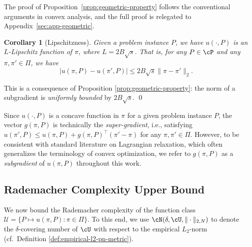 \documentclass{article}
\theoremstyle{plain}
\newtheorem{corollary}[theorem]{Corollary}
\theoremstyle{definition}
\theoremstyle{remark}
\begin{document}
The proof of Proposition~\ref{prop:geometric-property} follows the conventional arguments in convex analysis, and the full proof is relegated to Appendix~\ref{sec:app-geometric}.


\begin{corollary}[Lipschitzness] \label{cor:bounded-diam}
    Given a problem instance $P$, we have $u(\cdot, P)$ is an $L$-Lipschitz function of $\pi$, where $L = 2B\sqrt{s}$. That is, for any $P \in \cP$ and any $\pi, \pi' \in \Pi$, we have
    \[
        |u(\pi, P) - u(\pi', P)| \le 2B\sqrt{s} \|\pi - \pi'\|_2.
    \]
\end{corollary}
\proof
    This is a consequence of Proposition \ref{prop:geometric-property}: the norm of a subgradient is \textit{uniformly bounded} by $2B\sqrt{s}$.
\qed


Since $u(\cdot, P)$ is a concave function in $\pi$ for a given problem instance $P$, the vector $g(\pi, P)$ is technically the \textit{super-gradient}, i.e., satisfying $u(\pi', P) \leq u(\pi, P) + g(\pi, P)^\top (\pi' - \pi)$ for any $\pi,\pi' \in \Pi$. However, to be consistent with standard literature on Lagrangian relaxation, which often generalizes the terminology of convex optimization, we refer to $g(\pi, P)$ as a \textit{subgradient} of $u(\pi, P)$ throughout this work. 

\subsection{Rademacher Complexity Upper Bound} \label{sec:upper-bound-data-driven-learning-lagrangian}
We now bound the Rademacher complexity of the function class $\mathcal{U} = \{ P \mapsto u(\pi, P) : \pi \in \Pi \}$. To this end, we use $\cN(\delta, \cU, \|\cdot\|_{2, N})$ to denote the $\delta$-covering number of $\cU$ with respect to the empirical $L_2$-norm (cf.~Definition \ref{def:empirical-l2-pn-metric}). 
\end{document}
